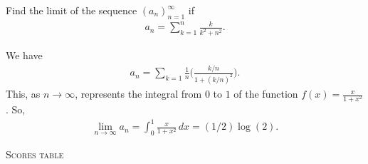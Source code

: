 \documentclass[addpoints, 12pt]{exam}%
\newcommand{\ra}{\rightarrow}
\theoremstyle{definition}
\begin{document}
\begin{questions}
	
\newpage

\question[10]
Find the limit of the sequence $(a_n)_{n =1}^\infty$ if
	\begin{align*}
	a_n = \sum_{k = 1}^n \frac{k}{k^2 + n^2}.
	\end{align*}

	\begin{solution}
	We have
		\begin{align*}
		a_n = \sum_{k = 1} \frac{1}{n} \Big( \frac{k/n}{1 + (k/n)^2} \Big) .
		\end{align*}
	This, as $n \ra \infty$, represents the integral from $0$ to $1$ of the function $f(x) = \frac{x}{1 + x^2}$. So,
		\begin{align*}
		\lim_{n \ra \infty} a_n = \int_0^1 \frac{x}{1 + x^2} \, dx = (1/2) \log (2) .
		\end{align*}
	\end{solution}
	
	
\end{questions}


\vfill
\noindent\hrulefill \hspace{0.1cm} \textsc{Scores table}\hspace{0.1cm} \hrulefill

\begin{center}
\gradetable[h][questions]
\end{center}
\end{document}
